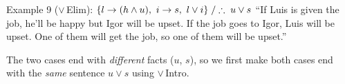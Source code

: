\begin{nbexample}{Example 9 ($\lor$\,Elim): $\{l \rightarrow (h \land u),\ i \rightarrow s,\ l \lor i\} \;/\therefore\; u \lor s$}
``If Luis is given the job, he'll be happy but Igor will be upset. If the job goes to Igor,
Luis will be upset. One of them will get the job, so one of them will be upset.''
\begin{fitchproof}
 \RPrem
{} \RPrem
{} \RPrem
\open
{} \RAss
{} 
 
 
\close
\open
{} \RAss
{} 
 
\close
{} 
\end{fitchproof}
The two cases end with \emph{different} facts ($u$, $s$), so we first make both cases end
with the \emph{same} sentence $u \lor s$ using $\lor$\,Intro.
\end{nbexample}

